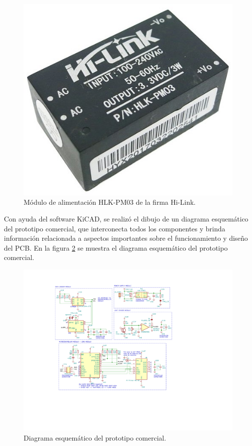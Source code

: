 \begin{figure}[h]
	\centering
	\includegraphics[scale=0.26]{./Figures/acdc_module.jpg}
	\caption{Módulo de alimentación HLK-PM03 de la firma Hi-Link\protect\footnotemark.}
		\label{fig:powerModule}
\end{figure}

	
Con ayuda del software KiCAD, se realizó el dibujo de un diagrama esquemático del prototipo comercial, que interconecta todos los componentes y brinda información relacionada a aspectos importantes sobre el funcionamiento y diseño del PCB. En la figura \ref{fig:schematic} se muestra el diagrama esquemático del prototipo comercial.

\begin{figure}[h]
	\centering
	\includegraphics[scale=0.9]{./Figures/schematic.pdf}
	\caption{Diagrama esquemático del prototipo comercial.}
		\label{fig:schematic}
\end{figure}

